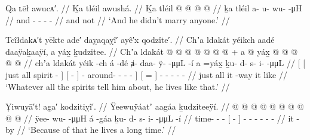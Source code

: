 \ex\label{ex:100-229-didnt-marry}%
%
\begingl
	\glpreamble	Qa ʟēł awucᴀ′. //
	\glpreamble	Ḵa tléil awushá. //
	\gla	Ḵa tléil  @ {} @ {} @ {} @ {} //
	\glb	ḵa tléil a- u- wu-  -μH //
	\glc	and  - - -  - //
	\gld	and not  {} {} {} {} //
	\glft	‘And he didn’t marry anyone.’
		//
\endgl
\xe


\ex\label{ex:100-230-didnt-marry}%
%
\begingl
	\glpreamble	Tcîłdakᴀ′t yēktc ade′ daỵaqaỵî′ ayê′x qodzîte′. //
	\glpreamble	Chʼa ldakát yéikch aadé daaÿaḵaaÿí, a yáx̱ ḵudzitee. //
	\gla	{} {} Chʼa ldakát  @ {} {}
			{}  @ {} {}
			 @ {} @ {} @ {} @ {} @ {} {} +
		{} a @ \•yáx̱ {}
		 @ {} @ {} @ {} @ {} @ {} //
	\glb	{} {} chʼa ldakát yéik -ch {}
			{} á -dé {}
			ⱥ- daa- ÿ-  -μμL -í {}
		{} a =yáx̱ {}
		ḵu- d- s- i-  -μμL //
	\glc	{}[ {}[ just all spirit - {}]
			{}[  - {}]
			- around- -  - - {}]
		{}[  = {}]
		- - - -  - //
	\gld	{} {} just all  {} {}
			{} it -way {}
			 {} {} {} {} {} {}
		{} it \•like {}
		 {} {} {} {} {} //
	\glft	‘Whatever all the spirits tell him about, he lives like that.’
		//
\endgl
\xe

\ex\label{ex:100-231-live-long}%
%
\begingl
	\glpreamble	Ỵiwuyā′t! ag̣a′ kodzitiỵî′. //
	\glpreamble	Ÿeewuÿáatʼ aag̱áa ḵudziteeÿí. //
	\gla	{} @ {} @ {} @ {}
		{}  @ {} {}
		 @ {} @ {} @ {} @ {} @ {} @ {} //
	\glb	ÿee- wu-  -μμH
		{} á -g̱áa {} 
		ḵu- d- s- i-  -μμL -í //
	\glc	time- -  -
		{}[  - {}]
		- - - -  - - //
	\gld	{} {} {} {}
		{} it -by {}
		 {} {} {} {} {} //
	\glft	‘Because of that he lives a long time.’
		//
\endgl
\xe

